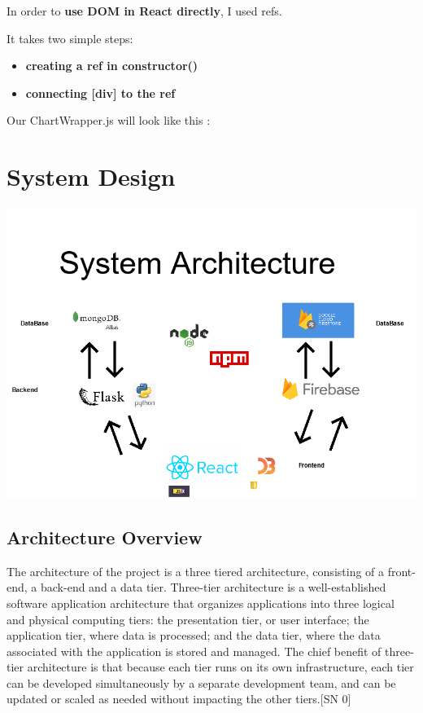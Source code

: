 In order to \textbf{use DOM in React directly}, I used refs.

It takes two simple steps:

\begin{itemize}

\item \textbf{creating a ref in constructor()}
\item \textbf{connecting [div] to the ref}

\end{itemize}

Our ChartWrapper.js will look like this :



\chapter{System Design}
\begin{center}
      \includegraphics[scale=0.5]{img/basic architecture.png}
\end{center}

\section{Architecture Overview}
The architecture of the project is a three tiered architecture, consisting of a front-end, a back-end and a data tier.
Three-tier architecture is a well-established software application architecture that organizes applications into three logical and physical computing tiers: the presentation tier, or user interface; the application tier, where data is processed; and the data tier, where the data associated with the application is stored and managed.
The chief benefit of three-tier architecture is that because each tier runs on its own infrastructure, each tier can be developed simultaneously by a separate development team, and can be updated or scaled as needed without impacting the other tiers.[SN 0]

